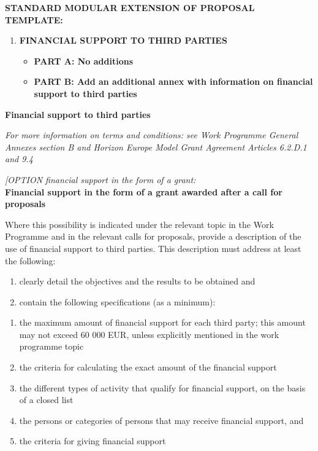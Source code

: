 \textbf{STANDARD MODULAR EXTENSION OF PROPOSAL TEMPLATE:}

\begin{enumerate}
\def\labelenumi{\arabic{enumi}.}
\item
  \textbf{FINANCIAL SUPPORT TO THIRD PARTIES}

  \begin{itemize}
  \item
    \textbf{PART A: No additions}
  \item
    \textbf{PART B: Add an additional annex with information on
    financial support to third parties}
  \end{itemize}
\end{enumerate}

\textbf{Financial support to third parties}

\emph{For more information on terms and conditions: see Work Programme
General Annexes section B and Horizon Europe Model Grant Agreement
Articles 6.2.D.1 and 9.4 }

\emph{{[}OPTION financial support in the form of a grant:}\textbf{ }\\
\textbf{Financial support in the form of a grant awarded after a call
for proposals}

Where this possibility is indicated under the relevant topic in the Work
Programme and in the relevant calls for proposals, provide a description
of the use of financial support to third parties. This description must
address at least the following:

\begin{enumerate}
\def\labelenumi{\arabic{enumi}.}
\item
  clearly detail the objectives and the results to be obtained and
\item
  contain the following specifications (as a minimum):
\end{enumerate}

\begin{enumerate}
\def\labelenumi{\alph{enumi}.}
\item
  the maximum amount of financial support for each third party; this
  amount may not exceed 60 000 EUR, unless explicitly mentioned in the
  work programme topic
\item
  the criteria for calculating the exact amount of the financial support
\item
  the different types of activity that qualify for financial support, on
  the basis of a closed list
\item
  the persons or categories of persons that may receive financial
  support, and
\item
  the criteria for giving financial support
\end{enumerate}

